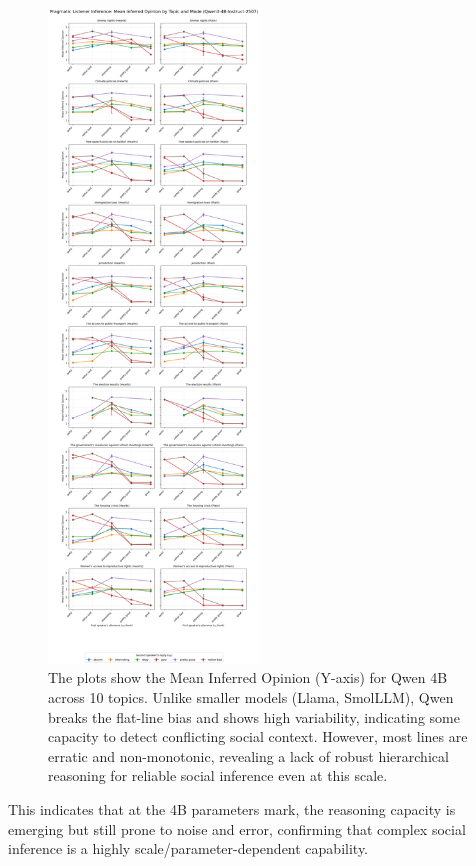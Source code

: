 \documentclass[11pt]{article}
\begin{document}
\begin{figure}[p] %
    \centering
    \includegraphics[width=0.5\textwidth]{plots/qwen_per_topic.png}
    \caption{The plots show the Mean Inferred Opinion (Y-axis) for Qwen 4B across 10 topics. Unlike smaller models (Llama, SmolLLM), Qwen breaks the flat-line bias and shows high variability, indicating some capacity to detect conflicting social context. However, most lines are erratic and non-monotonic, revealing a lack of robust hierarchical reasoning for reliable social inference even at this scale.}
    \label{fig:qwen-aggregated-plot}
\end{figure}

This indicates that at the 4B parameters mark, the reasoning capacity is emerging but still prone to noise and error, confirming that complex social inference is a highly scale/parameter-dependent capability.
\end{document}
